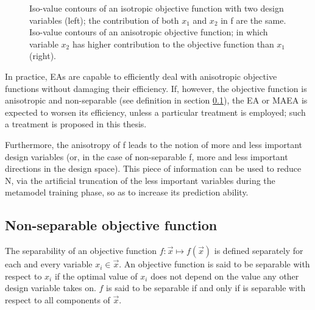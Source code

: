   


\begin{figure}[h!]
\begin{minipage}[b]{1.0\linewidth}
 \centering
\end{minipage}
\caption{Iso-value contours of an isotropic objective function with two design variables (left); the contribution of both $x_1$ and $x_2$ in f are the same. Iso-value contours of an anisotropic objective function; in which variable $x_2$ has higher contribution to the objective function than $x_1$ (right).} 
\label{illc}
\end{figure}

In practice, EAs are capable to efficiently deal with anisotropic objective functions without damaging their efficiency. If, however, the objective function is anisotropic and non-separable (see definition in section \ref{Nonsep}), the EA or MAEA is expected to worsen its efficiency, unless a particular treatment is employed; such a treatment is proposed in this thesis.  

Furthermore, the anisotropy of f leads to the notion of more and less important design variables (or, in the case of non-separable f, more and less important directions in the design space). This piece of information can be used to reduce N, via the artificial truncation of the less important variables during the metamodel training phase, so as to increase its prediction ability.       


\subsection{Non-separable objective function}     
\label{Nonsep}
The separability of an objective function $f:\vec{x}\mapsto f(\vec{x})$ is defined separately for each and every variable $x_i \in \vec{x}$. An objective function is said to be separable with respect to $x_i$ if the optimal value of $x_i$ does not depend on the value  any other design variable takes on. $f$ is said to be separable if and only if is separable with respect to all components of $\vec{x}$.


